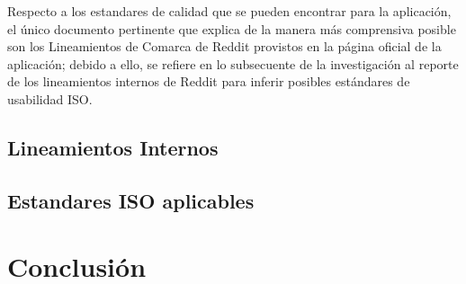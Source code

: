 Respecto a los estandares de calidad que se pueden encontrar para la aplicación, el único documento pertinente
que explica de la manera más comprensiva posible son los Lineamientos de Comarca de Reddit %
provistos en la página oficial de la aplicación; debido a ello, se refiere en lo subsecuente de la investigación
al reporte de los lineamientos internos de Reddit para inferir posibles estándares de usabilidad ISO.

\subsection{Lineamientos Internos}

\subsection{Estandares ISO aplicables}

\section{Conclusión}


